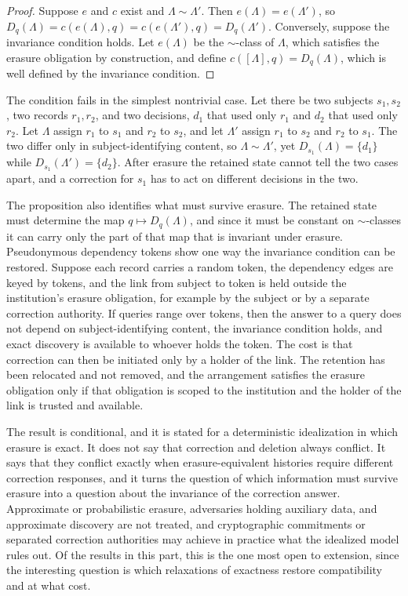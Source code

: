 \documentclass[11pt]{article}
\theoremstyle{plain}
\theoremstyle{definition}
\theoremstyle{remark}
\begin{document}
\begin{proof}
Suppose $e$ and $c$ exist and $\Lambda\sim\Lambda'$. Then $e(\Lambda)=e(\Lambda')$, so $D_q(\Lambda)=c(e(\Lambda),q)=c(e(\Lambda'),q)=D_q(\Lambda')$. Conversely, suppose the invariance condition holds. Let $e(\Lambda)$ be the $\sim$-class of $\Lambda$, which satisfies the erasure obligation by construction, and define $c([\Lambda],q)=D_q(\Lambda)$, which is well defined by the invariance condition.
\end{proof}

The condition fails in the simplest nontrivial case. Let there be two subjects $s_1,s_2$, two records $r_1,r_2$, and two decisions, $d_1$ that used only $r_1$ and $d_2$ that used only $r_2$. Let $\Lambda$ assign $r_1$ to $s_1$ and $r_2$ to $s_2$, and let $\Lambda'$ assign $r_1$ to $s_2$ and $r_2$ to $s_1$. The two differ only in subject-identifying content, so $\Lambda\sim\Lambda'$, yet $D_{s_1}(\Lambda)=\{d_1\}$ while $D_{s_1}(\Lambda')=\{d_2\}$. After erasure the retained state cannot tell the two cases apart, and a correction for $s_1$ has to act on different decisions in the two.

The proposition also identifies what must survive erasure. The retained state must determine the map $q\mapsto D_q(\Lambda)$, and since it must be constant on $\sim$-classes it can carry only the part of that map that is invariant under erasure. Pseudonymous dependency tokens show one way the invariance condition can be restored. Suppose each record carries a random token, the dependency edges are keyed by tokens, and the link from subject to token is held outside the institution's erasure obligation, for example by the subject or by a separate correction authority. If queries range over tokens, then the answer to a query does not depend on subject-identifying content, the invariance condition holds, and exact discovery is available to whoever holds the token. The cost is that correction can then be initiated only by a holder of the link. The retention has been relocated and not removed, and the arrangement satisfies the erasure obligation only if that obligation is scoped to the institution and the holder of the link is trusted and available.

The result is conditional, and it is stated for a deterministic idealization in which erasure is exact. It does not say that correction and deletion always conflict. It says that they conflict exactly when erasure-equivalent histories require different correction responses, and it turns the question of which information must survive erasure into a question about the invariance of the correction answer. Approximate or probabilistic erasure, adversaries holding auxiliary data, and approximate discovery are not treated, and cryptographic commitments or separated correction authorities may achieve in practice what the idealized model rules out. Of the results in this part, this is the one most open to extension, since the interesting question is which relaxations of exactness restore compatibility and at what cost.
\end{document}
